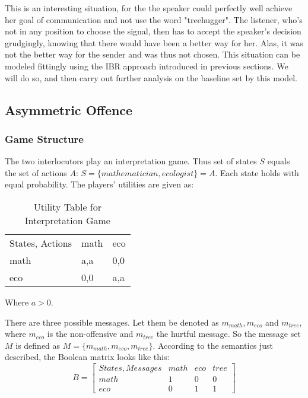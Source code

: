 \documentclass{article}
\begin{document}
This is an interesting situation, for the the speaker could perfectly well achieve her goal of communication and not use the word "treehugger". The listener, who's not in any position to choose the signal, then has to accept the speaker's decision grudgingly, knowing that there would have been a better way for her. Alas, it was not the better way for the sender and was thus not chosen. This situation can be modeled fittingly using the IBR approach introduced in previous sections. We will do so, and then carry out further analysis on the baseline set by this model.
\subsection{Asymmetric Offence}
\subsubsection{Game Structure}
The two interlocutors play an interpretation game. Thus set of states $S$ equals the set of actions $A$: $S=\{mathematician,ecologist\}=A$. Each state holds with equal probability. The players' utilities are given as:\\

\begin{table}[h]
\centering
\caption{Utility Table for Interpretation Game}
\label{my-label}
\begin{tabular}{lll}
States, Actions & math & eco \\
math            & a,a  & 0,0 \\
eco             & 0,0  & a,a
\end{tabular}
\end{table}
Where $a>0$.

There are three possible messages. Let them be denoted as $m_{math},m_{eco}$ and $m_{tree}$, where $m_{eco}$ is the non-offensive and $m_{tree}$ the hurtful message. So the message set $M$ is defined as $M=\{m_{math},m_{eco},m_{tree}\}$. According to the semantics just described, the Boolean matrix looks like this:\\
\begin{equation*}
B =
\begin{bmatrix}

States, Messages & math & eco & tree \\
math             & 1    & 0   & 0    \\
eco              & 0    & 1   & 1   
\end{bmatrix}
\end{equation*}
\end{document}
